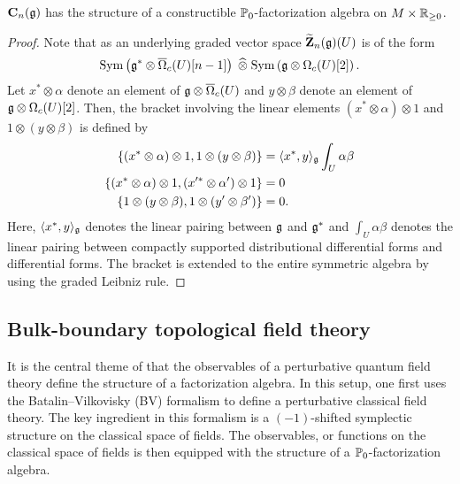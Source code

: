 \documentclass[11pt]{amsart}
\numberwithin{equation}{section}
\begin{document}
\begin{lmm}
$\mathbf C_n(\mathfrak g)$ has the structure of a constructible $\mathbb P_0$-factorization algebra on $M \times \mathbb R_{\geq 0}$. 
\end{lmm}
\begin{proof}
Note that as an underlying graded vector space $\widetilde{\mathbf Z}_n(\mathfrak g) (U)$ is of the form
\[
{\rm Sym} \left(\mathfrak g^* \otimes \overline{\Omega}_c (U) [n-1] \right) \; \widehat{\otimes} \; {\rm Sym}  \left(\mathfrak g \otimes \Omega_c(U) [2] \right)  .
\]
Let $x^* \otimes \alpha$ denote an element of $\mathfrak g \otimes \overline{\Omega}_c (U)$ and $y \otimes \beta$ denote an element of $\mathfrak g \otimes \Omega_c(U) [2]$. 
Then, the bracket involving the linear elements $(x^* \otimes \alpha) \otimes 1$ and $1 \otimes (y \otimes \beta)$ is defined by
\begin{align*}
\{(x^* \otimes \alpha) \otimes 1 , 1 \otimes (y \otimes \beta)\} & = \langle x^*, y\rangle_\mathfrak g \int_U \alpha \beta \\
\{(x^* \otimes \alpha) \otimes 1 , (x'^* \otimes \alpha') \otimes 1\} & = 0 \\
\{1 \otimes (y \otimes \beta) , 1 \otimes (y' \otimes \beta')\} & = 0 . 
\end{align*}
Here, $\langle x^*, y\rangle_\mathfrak g$ denotes the linear pairing between $\mathfrak g$ and $\mathfrak g^*$ and $\int_U\alpha \beta$ denotes the linear pairing between compactly supported distributional differential forms and differential forms. 
The bracket is extended to the entire symmetric algebra by using the graded Leibniz rule.
\end{proof}



\subsection{Bulk-boundary topological field theory}

It is the central theme of \cite{CG1, CG2} that the observables of a perturbative quantum field theory define the structure of a factorization algebra. 
In this setup, one first uses the Batalin--Vilkovisky (BV) formalism to define a perturbative classical field theory. 
The key ingredient in this formalism is a $(-1)$-shifted symplectic structure on the classical space of fields. 
The observables, or functions on the classical space of fields is then equipped with the structure of a $\mathbb P_0$-factorization algebra.
\end{document}
